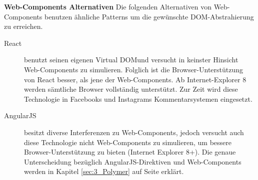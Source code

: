 \textbf{Web-Components Alternativen}
Die folgenden Alternativen von Web-Components benutzen ähnliche Patterns um die gewünschte DOM-Abstrahierung zu erreichen.
\begin{description}
\item[React] benutzt seinen eigenen \glqq Virtual DOM\grqq und versucht in keinster Hinsicht Web-Components zu simulieren. Folglich ist die Browser-Unterstützung von React besser, als jene der Web-Components. Ab Internet-Explorer 8 werden sämtliche Browser vollständig unterstützt. Zur Zeit wird diese Technologie in Facebooks und Instagrams Kommentarsystemen eingesetzt.
\item[AngularJS] besitzt diverse Interferenzen zu Web-Components, jedoch versucht auch diese Technologie nicht Web-Components zu simulieren, um bessere Browser-Unterstützung zu bieten (Internet Explorer 8+). Die genaue Unterscheidung bezüglich AngularJS-Direktiven und Web-Components werden in Kapitel \ref{sec:3_Polymer} auf Seite \pageref{sec:3_Polymer} erklärt.
\end{description}
